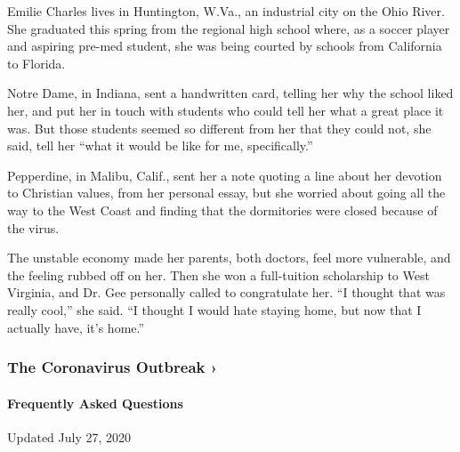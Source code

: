 Emilie Charles lives in Huntington, W.Va., an industrial city on the
Ohio River. She graduated this spring from the regional high school
where, as a soccer player and aspiring pre-med student, she was being
courted by schools from California to Florida.

Notre Dame, in Indiana, sent a handwritten card, telling her why the
school liked her, and put her in touch with students who could tell her
what a great place it was. But those students seemed so different from
her that they could not, she said, tell her ``what it would be like for
me, specifically.''

Pepperdine, in Malibu, Calif., sent her a note quoting a line about her
devotion to Christian values, from her personal essay, but she worried
about going all the way to the West Coast and finding that the
dormitories were closed because of the virus.

The unstable economy made her parents, both doctors, feel more
vulnerable, and the feeling rubbed off on her. Then she won a
full-tuition scholarship to West Virginia, and Dr. Gee personally called
to congratulate her. ``I thought that was really cool,'' she said. ``I
thought I would hate staying home, but now that I actually have, it's
home.''

\href{https://www.nytimes.com/news-event/coronavirus?action=click\&pgtype=Article\&state=default\&region=MAIN_CONTENT_3\&context=storylines_faq}{}

\hypertarget{the-coronavirus-outbreak-}{%
\subsubsection{The Coronavirus Outbreak
›}\label{the-coronavirus-outbreak-}}

\hypertarget{frequently-asked-questions}{%
\paragraph{Frequently Asked
Questions}\label{frequently-asked-questions}}

Updated July 27, 2020

